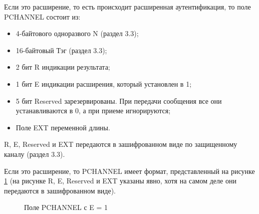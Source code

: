 Если это расширение, то есть происходит расширенная аутентификация, то поле PCHANNEL состоит из:

\begin{itemize}
\item 4-байтового одноразвого N (раздел 3.3);
\item 16-байтовый Тэг (раздел 3.3);
\item 2 бит R индикации результата;
\item 1 бит E индикации расширения, который установлен в 1;
\item 5 бит Reserved зарезервированы. При передачи сообщения все они устанавливаются в 0, а при приеме игнорируются;
\item Поле EXT переменной длины.
\end{itemize}

R, E, Reserved и EXT передаются в зашифрованном виде по защищенному каналу (раздел 3.3).

Если это расширение, то PCHANNEL имеет формат, представленный на рисунке \ref{img:ext_pchannel} (на рисунке R, E, Reserved и EXT указаны явно, хотя на самом деле они передаются в зашифрованном виде).

\begin{figure}[h!]
\caption{Поле PCHANNEL с E = 1}
\label{img:ext_pchannel}
\end{figure}


